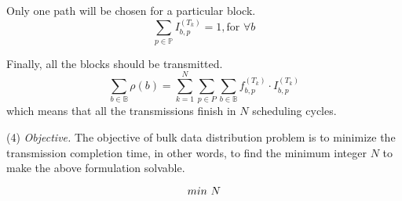 \begin{packeditemize}
\item Only one path will be chosen for a particular block.
\begin{equation}
\displaystyle{\sum_{p \in \mathbb{P}}} I^{(T_k)}_{b,p} = 1, \text{for }\forall b
\end{equation}

\item Finally, all the blocks should be transmitted.
\begin{equation}
\displaystyle{\sum_{b\in \mathbb{B}}} \rho(b) = \displaystyle{\sum_{k=1}^{N}} \displaystyle{\sum_{p\in P}} \displaystyle{\sum_{b\in \mathbb{B}}} f_{b,p}^{(T_k)} \cdot I_{b,p}^{(T_k)}
\end{equation}
which means that all the transmissions finish in $N$ scheduling cycles.
\end{packeditemize}


\noindent(4) {\em Objective.} The objective of bulk data distribution problem is to minimize the transmission completion time, in other words, to find the minimum integer $N$ to make the above formulation solvable.

\begin{equation}
\centering
min \text{ } N
\label{equation:objective}
\end{equation}




